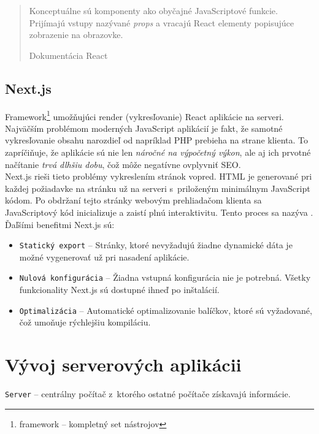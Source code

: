 \bigskip

\blockquote[Dokumentácia React \cite{React}]{Konceptuálne sú komponenty ako obyčajné JavaScriptové funkcie. Prijímajú vstupy nazývané \emph{props} a vracajú React elementy popisujúce zobrazenie na obrazovke.}

\subsection{Next.js}
Framework\footnote{framework -- kompletný set nástrojov} umožňujúci render (vykresľovanie) React aplikácie na serveri. \\

\noindent Najväčším problémom moderných JavaScript aplikácií je fakt, že samotné vykresľovanie obsahu narozdieľ od napríklad PHP prebieha na strane klienta. To zapríčiňuje, že aplikácie sú nie len \emph{náročné na výpočetný výkon}, ale aj ich prvotné načítanie \emph{trvá dlhšiu dobu}, čož môže negatívne ovplyvniť SEO. \\

\noindent Next.js rieši tieto problémy vykreslením stránok vopred. HTML je generované pri každej požiadavke na stránku už na serveri s~priloženým minimálnym JavaScript kódom. Po obdržaní tejto stránky webovým prehliadačom klienta sa JavaScriptový kód inicializuje a zaistí plnú interaktivitu. Tento proces sa nazýva . \cite{NextJS} \\

\noindent Ďaľšími benefitmi Next.js sú:
\begin{itemize}
	\item \texttt{Statický export} -- Stránky, ktoré nevyžadujú žiadne dynamické dáta je možné vygenerovať už pri nasadení aplikácie. \cite{NextJS}
	\item \texttt{Nulová konfigurácia} -- Žiadna vstupná konfigurácia nie je potrebná. Všetky funkcionality Next.js sú dostupné ihneď po inštalácií. \cite{NextJS}
	\item \texttt{Optimalizácia} -- Automatické optimalizovanie balíčkov, ktoré sú vyžadované, čož umoňuje rýchlejšiu kompiláciu. \cite{NextJS}
\end{itemize}

\section{Vývoj serverových aplikácii}
\label{section:server_dev}
\texttt{Server} -- centrálny počítač z~ktorého ostatné počítače získavajú informácie. \cite{CamDict} \\


